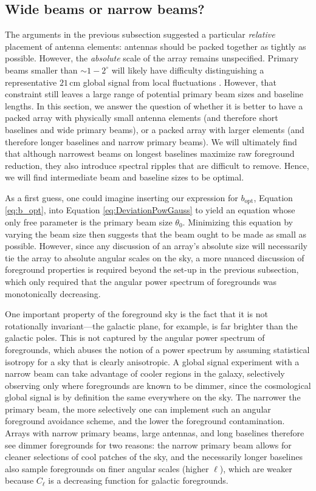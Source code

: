 \documentclass[twocolumn,apj,numberedappendix]{emulateapj}
\newcommand{\mep}[1]{}
\begin{document}
\subsection{Wide beams or narrow beams?}
\label{sec:beamSize}

The arguments in the previous subsection suggested a particular \emph{relative} placement of antenna elements: antennas should be packed together as tightly as possible. However, the \emph{absolute} scale of the array remains unspecified. Primary beams smaller than $\sim1-2^\circ$ will likely have difficulty distinguishing a representative $21\,\textrm{cm}$ global signal from local fluctuations \citep{BittnerLoeb2011}. However, that constraint still leaves a large range of potential primary beam sizes and baseline lengths. \mep{Updated for reviewer comment} In this section, we answer the question of whether it is better to have a packed array with physically small antenna elements (and therefore short baselines and wide primary beams), or a packed array with larger elements (and therefore longer baselines and narrow primary beams). We will ultimately find that although narrowest beams on longest baselines maximize raw foreground reduction, they also introduce spectral ripples that are difficult to remove. Hence, we will find intermediate beam and baseline sizes to be optimal.

As a first guess, one could imagine inserting our expression for $b_\textrm{opt}$, Equation \eqref{eq:b_opt}, into Equation \eqref{eq:DeviationPowGauss} to yield an equation whose only free parameter is the primary beam size $\theta_0$. Minimizing this equation by varying the beam size then suggests that the beam ought to be made as small as possible. However, since any discussion of an array's absolute size will necessarily tie the array to absolute angular scales on the sky, a more nuanced discussion of foreground properties is required beyond the set-up in the previous subsection, which only required that the angular power spectrum of foregrounds was monotonically decreasing.

One important property of the foreground sky is the fact that it is not rotationally invariant---the galactic plane, for example, is far brighter than the galactic poles. This is not captured by the angular power spectrum of foregrounds, which abuses the notion of a power spectrum by assuming statistical isotropy for a sky that is clearly anisotropic. A global signal experiment with a narrow beam can take advantage of cooler regions in the galaxy, selectively observing only where foregrounds are known to be dimmer, since the cosmological global signal is by definition the same everywhere on the sky. The narrower the primary beam, the more selectively one can implement such an angular foreground avoidance scheme, and the lower the foreground contamination. Arrays with narrow primary beams, large antennas, and long baselines therefore see dimmer foregrounds for two reasons: the narrow primary beam allows for cleaner selections of cool patches of the sky, and the necessarily longer baselines also sample foregrounds on finer angular scales (higher $\ell$), which are weaker because $C_\ell$ is a decreasing function for galactic foregrounds.
\end{document}

